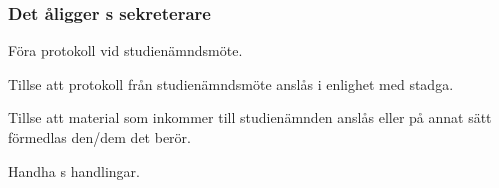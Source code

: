 \subsubsection{Det åligger \SNIT{}s sekreterare}
\begin{att}
	\item Föra protokoll vid studienämndsmöte.
	\item Tillse att protokoll från studienämndsmöte anslås i enlighet med stadga.
	\item Tillse att material som inkommer till studienämnden anslås eller på annat sätt förmedlas den/dem det berör.
	\item Handha \SNIT{}s handlingar.
\end{att}



